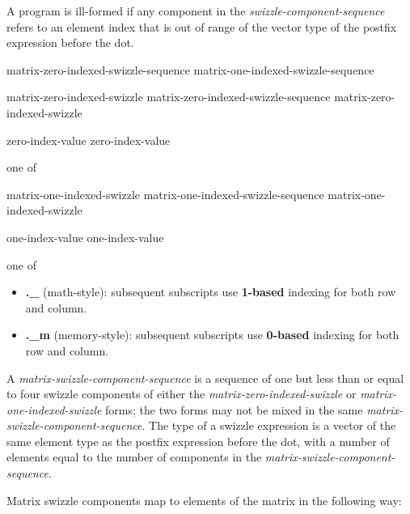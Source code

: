 \p A program is ill-formed if any component in the \textit{swizzle-component-sequence}
refers to an element index that is out of range of the vector type of the
postfix expression before the dot.

\begin{grammar}
  \br
  matrix-zero-indexed-swizzle-sequence\br
  matrix-one-indexed-swizzle-sequence\br

  \br
  matrix-zero-indexed-swizzle\br
  matrix-zero-indexed-swizzle-sequence matrix-zero-indexed-swizzle\br

  \br
   zero-index-value zero-index-value\br

   \textnormal{one of}\br
  \br

  \br
  matrix-one-indexed-swizzle\br
  matrix-one-indexed-swizzle-sequence matrix-one-indexed-swizzle\br

  \br
  \terminal{\_} one-index-value one-index-value\br

   \textnormal{one of}\br
  \br
\end{grammar}
\begin{itemize}
\item \textbf{.\_} (math-style): subsequent subscripts use \textbf{1-based}
 indexing for both row and column.
\item \textbf{.\_m} (memory-style): subsequent subscripts use \textbf{0-based}
 indexing for both row and column.
\end{itemize}

\p A \textit{matrix-swizzle-component-sequence} is a sequence of one but less
than or equal to four swizzle components of either the
\textit{matrix-zero-indexed-swizzle} or \textit{matrix-one-indexed-swizzle}
forms; the two forms may not be mixed in the same
\textit{matrix-swizzle-component-sequence}. The type of a swizzle expression is
a vector of the same element type as the postfix expression before the dot,
with a number of elements equal to the number of components in the
\textit{matrix-swizzle-component-sequence}.

\p Matrix swizzle components map to elements of the matrix in the following way:

